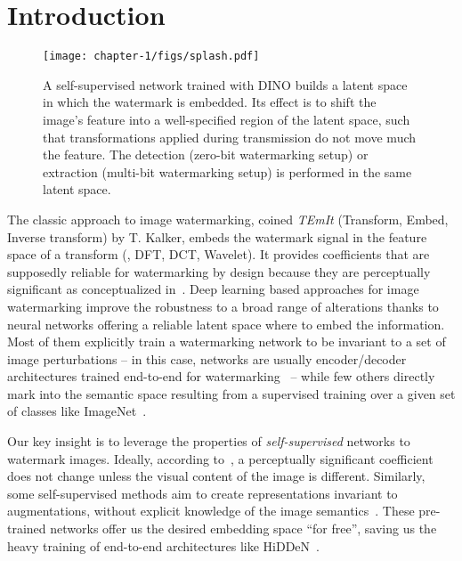 
\section{Introduction}\label{chap1/sec:introduction}

\begin{figure*}[t]
    \centering
    \texttt{[image: chapter-1/figs/splash.pdf]}
    \caption{
    A self-supervised network trained with DINO \citep{caron2021dino} builds a latent space in which the watermark is embedded.
    Its effect is to shift the image's feature into a well-specified region of the latent space, such that transformations applied during transmission do not move much the feature. 
    The detection (zero-bit watermarking setup) or extraction (multi-bit watermarking setup) is performed in the same latent space.}
    \label{chap1/fig:splash}
\end{figure*}


The classic approach to image watermarking, coined \emph{TEmIt} (Transform, Embed, Inverse transform) by T. Kalker, embeds the watermark signal in the feature space of a transform (\eg, DFT, DCT, Wavelet). 
It provides coefficients that are supposedly reliable for watermarking by design because they are perceptually significant as conceptualized in~\cite[Sec.~8.1.3]{cox2007digital}. 
Deep learning based approaches for image watermarking improve the robustness to a broad range of alterations thanks to neural networks offering a reliable latent space where to embed the information.
Most of them explicitly train a watermarking network to be invariant to a set of image perturbations -- in this case, networks are usually encoder/decoder architectures trained end-to-end for watermarking~\citep{zhu2018hidden,wen2019romark, ahmadi2020redmark} -- while few others directly mark into the semantic space resulting from a supervised training over a given set of classes like ImageNet~\citep{vukotic2020classification}.

Our key insight is to leverage the properties of \emph{self-supervised} networks to watermark images.
Ideally, according to~\cite{cox2007digital}, a perceptually significant coefficient does not change unless the visual content of the image is different.
Similarly, some self-supervised methods aim to create representations invariant to augmentations, without explicit knowledge of the image semantics~\citep{caron2021dino,grill2020byol}.
These pre-trained networks offer us the desired embedding space ``for free'', saving us the heavy training of end-to-end architectures like HiDDeN~\citep{zhu2018hidden}.

